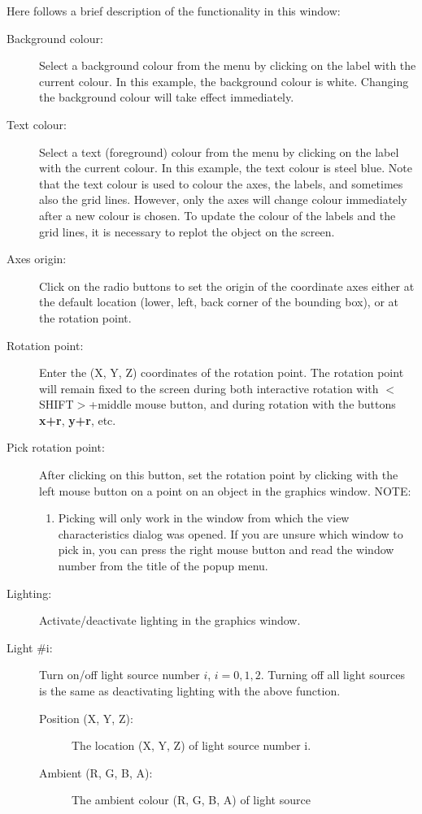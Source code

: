 \documentclass{article}
\begin{document}
Here follows a brief description of the functionality in this window:
\begin{description}
\item[Background colour:]Select a background colour from the menu by
clicking on the label with the current colour. In this example, the
background colour is white. Changing the background colour will take
effect immediately.
%
\item[Text colour:]Select a text (foreground) colour from the menu by
clicking on the label with the current colour. In this example, the
text colour is steel blue. Note that the text colour is used to colour
the axes, the labels, and sometimes also the grid lines. However, only
the axes will change colour immediately after a new colour is
chosen. To update the colour of the labels and the grid lines, it is
necessary to replot the object on the screen.
%
\item[Axes origin:] Click on the radio buttons to set the origin of
the coordinate axes either at the default location (lower, left,
back corner of the bounding box), or at the rotation point.
%
\item[Rotation point:] Enter the (X, Y, Z) coordinates of the rotation
point. The rotation point will remain fixed to the screen during both
interactive rotation with $<$SHIFT$>$+middle mouse button, and during
rotation with the buttons {\bf x+r}, {\bf y+r}, etc.
%
\item[Pick rotation point:]After clicking on this button, set the
rotation point by clicking with the left mouse button on a point
on an object in the graphics window. NOTE: 
\begin{enumerate}
\item Picking will only work in the window from which the view
characteristics dialog was opened. If you are unsure which window to
pick in, you can press the right mouse button and read the window
number from the title of the popup menu.
\end{enumerate}
%
\item[Lighting:]Activate/deactivate lighting in the graphics window.
%
\item[Light \#i:]Turn on/off light source number $i$,
$i=0,1,2$. Turning off all light sources is the same as deactivating
lighting with the above function.
%
\begin{description}
\item[Position (X, Y, Z):]The location (X, Y, Z) of light source
number i. 
\item[Ambient (R, G, B, A):]The ambient colour (R, G, B, A) of light source

\end{description}
\end{description}
\end{document}
